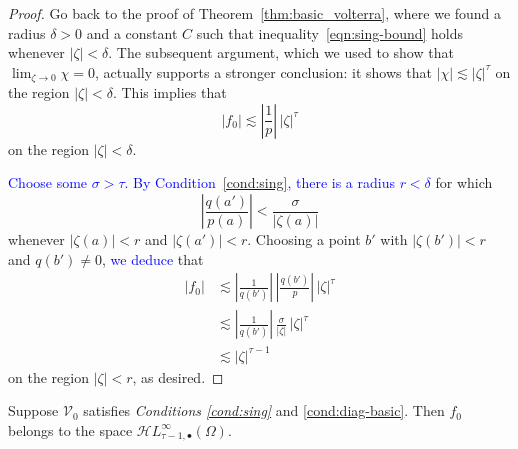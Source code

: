 \documentclass[review]{siamart220329}
\newcommand{\singexp}[2]{\mathcal{H}L^\infty_{#1, #2}}
\newcommand{\singexpalg}[1]{\singexp{#1}{\bullet}}
\newcommand{\hardpart}{\mathcal{V}_0}
\newcommand{\solproto}{f_0}
\newcommand{\domain}{\Omega}
\begin{document}
\begin{proof}
Go back to the proof of Theorem~\ref{thm:basic_volterra}, where we found a radius $\delta > 0$ and a constant $C$ such that inequality~\eqref{eqn:sing-bound} holds whenever $|\zeta| < \delta$. The subsequent argument, which we used to show that $\lim_{\zeta \to 0} \chi = 0$, actually supports a stronger conclusion: it shows that $|\chi| \lesssim |\zeta|^\tau$ on the region $|\zeta| < \delta$. This implies that
\[ |\solproto| \lesssim \left|\frac{1}{p}\right|\,|\zeta|^\tau \]
on the region $|\zeta| < \delta$.

\textcolor{blue}{Choose some $\sigma > \tau$. By Condition~\eqref{cond:sing}, there is a radius $r < \delta$} for which
\[ \left|\frac{q(a')}{p(a)}\right| < \frac{\sigma}{|\zeta(a)|} \]
whenever $|\zeta(a)| < r$ and $|\zeta(a')| < r$. Choosing a point $b'$ with $|\zeta(b')| < r$ and $q(b') \neq 0$, \textcolor{blue}{we deduce} that
\begin{align*}
|\solproto| & \lesssim \left|\frac{1}{q(b')}\right|\,\left|\frac{q(b')}{p}\right|\,|\zeta|^\tau \\
& \lesssim \left|\frac{1}{q(b')}\right|\,\frac{\sigma}{|\zeta|}\,|\zeta|^\tau \\
& \lesssim |\zeta|^{\tau-1}
\end{align*}
on the region $|\zeta| < r$, as desired.
\end{proof}
\begin{proposition}\label{prop:asymptotic at infinity}
Suppose $\hardpart$ satisfies {\em Conditions \eqref{cond:sing}} and \eqref{cond:diag-basic}. Then $\solproto$ belongs to the space $\singexpalg{\tau-1}(\domain)$.
\end{proposition}
\end{document}
